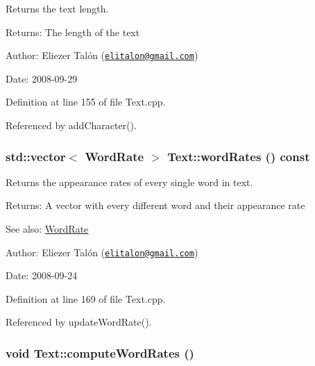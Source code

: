Returns the text length. 

\begin{Desc}
\item[Returns:]The length of the text\end{Desc}
\begin{Desc}
\item[Author:]Eliezer Talón (\href{mailto:elitalon@gmail.com}{\tt elitalon@gmail.com}) \end{Desc}
\begin{Desc}
\item[Date:]2008-09-29 \end{Desc}


Definition at line 155 of file Text.cpp.

Referenced by addCharacter().\hypertarget{class_text_1387d9767b65f80355f1bdede26a0f7b}{
\subsubsection[wordRates]{\setlength{\rightskip}{0pt plus 5cm}std::vector$<$ {\bf WordRate} $>$ Text::wordRates () const}}
\label{class_text_1387d9767b65f80355f1bdede26a0f7b}


Returns the appearance rates of every single word in text. 

\begin{Desc}
\item[Returns:]A vector with every different word and their appearance rate\end{Desc}
\begin{Desc}
\item[See also:]\hyperlink{_word_rate_8h_8cfef8793106ac45a83059bd5573cbb3}{WordRate}\end{Desc}
\begin{Desc}
\item[Author:]Eliezer Talón (\href{mailto:elitalon@gmail.com}{\tt elitalon@gmail.com}) \end{Desc}
\begin{Desc}
\item[Date:]2008-09-24 \end{Desc}


Definition at line 169 of file Text.cpp.

Referenced by updateWordRate().\hypertarget{class_text_8239e13039bcc1c713f66f1236693706}{
\subsubsection[computeWordRates]{\setlength{\rightskip}{0pt plus 5cm}void Text::computeWordRates ()}}
\label{class_text_8239e13039bcc1c713f66f1236693706}


